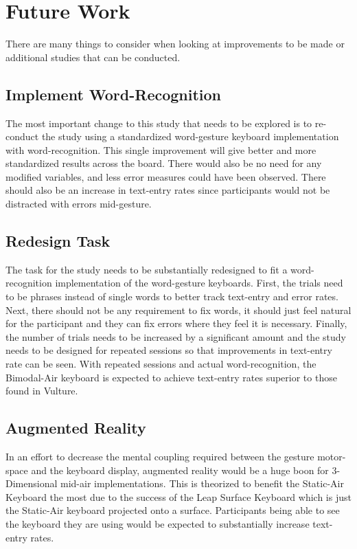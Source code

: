 \section{Future Work}
There are many things to consider when looking at improvements to be made or additional studies that can be conducted.

\subsection{Implement Word-Recognition}
The most important change to this study that needs to be explored is to re-conduct the study using a standardized word-gesture keyboard implementation with word-recognition. This single improvement will give better and more standardized results across the board. There would also be no need for any modified variables, and less error measures could have been observed. There should also be an increase in text-entry rates since participants would not be distracted with errors mid-gesture.

\subsection{Redesign Task}
The task for the study needs to be substantially redesigned to fit a word-recognition implementation of the word-gesture keyboards. First, the trials need to be phrases instead of single words to better track text-entry and error rates. Next, there should not be any requirement to fix words, it should just feel natural for the participant and they can fix errors where they feel it is necessary. Finally, the number of trials needs to be increased by a significant amount and the study needs to be designed for repeated sessions so that improvements in text-entry rate can be seen. With repeated sessions and actual word-recognition, the Bimodal-Air keyboard is expected to achieve text-entry rates superior to those found in Vulture.

\subsection{Augmented Reality}
In an effort to decrease the mental coupling required between the gesture motor-space and the keyboard display, augmented reality would be a huge boon for 3-Dimensional mid-air implementations. This is theorized to benefit the Static-Air Keyboard the most due to the success of the Leap Surface Keyboard which is just the Static-Air keyboard projected onto a surface. Participants being able to see the keyboard they are using would be expected to substantially increase text-entry rates.

